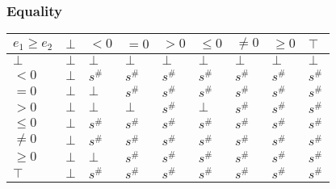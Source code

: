 \documentclass{beamer}
\begin{document}
                                \begin{frame}
                                    \frametitle{Equality}
                \begin{table}
                    \begin{tabular}{|l|l|l|l|l|l|l|l|l|}
                    \hline
                    $e_1 \ge e_2$ & $\bot$ & $<0$   & $=0$   & $>0$   & $\le 0$ & $\ne 0$ & $\ge 0$ & $\top$ \\ \hline
                    $\bot$        & $\bot$ & $\bot$ & $\bot$ & $\bot$ & $\bot$  & $\bot$  & $\bot$  & $\bot$ \\ \hline
                    $<0$          & $\bot$ & $s^\#$ & $s^\#$ & $s^\#$ & $s^\#$  & $s^\#$  & $s^\#$  & $s^\#$ \\ \hline
                    $=0$          & $\bot$ & $\bot$ & $s^\#$ & $s^\#$ & $s^\#$  & $s^\#$  & $s^\#$  & $s^\#$ \\ \hline
                    $>0$          & $\bot$ & $\bot$ & $\bot$ & $s^\#$ & $\bot$  & $s^\#$  & $s^\#$  & $s^\#$ \\ \hline
                    $\le 0$       & $\bot$ & $s^\#$ & $s^\#$ & $s^\#$ & $s^\#$  & $s^\#$  & $s^\#$  & $s^\#$ \\ \hline
                    $\ne 0$       & $\bot$ & $s^\#$ & $s^\#$ & $s^\#$ & $s^\#$  & $s^\#$  & $s^\#$  & $s^\#$ \\ \hline
                    $\ge 0$       & $\bot$ & $\bot$ & $s^\#$ & $s^\#$ & $s^\#$  & $s^\#$  & $s^\#$  & $s^\#$ \\ \hline
                    $\top$        & $\bot$ & $s^\#$ & $s^\#$ & $s^\#$ & $s^\#$  & $s^\#$  & $s^\#$  & $s^\#$ \\ \hline
                    \end{tabular}
                    \end{table}
                \end{frame}
\end{document}
